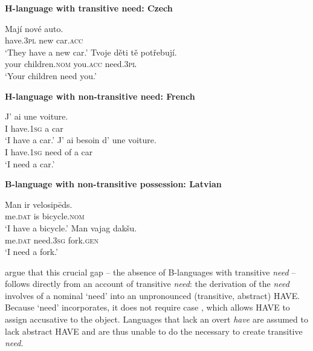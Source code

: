 \documentclass[output=paper,
modfonts
]{langscibook}
\begin{document}
\newpage 
\begin{exe}
\ex \textbf{H-language with transitive need: Czech} \hfill \citep[4a, 5a]{Harves:2012}
\begin{xlist}
\ex \gll Maj\'i nov\'e auto.\\
have.3{\textsc{pl}} new car.\textsc{acc}\\
\glt `They have a new car.'
\ex\gll Tvoje d\v{e}ti t\v{e} pot\v{r}ebuj\'i.\\
your children.{\textsc{nom}} you.{\textsc{acc}} need.3\textsc{pl}\\
\glt `Your children need you.' 
\end{xlist}

\ex \textbf{H-language with non-transitive need: French} \hfill \citep[6a, 7a]{Harves:2012}

\begin{xlist}

\ex \gll J' ai une voiture.\\
I have.1{\textsc{sg}} a car\\
\glt `I have a car.'
\ex\gll J' ai besoin d' une voiture.\\
I have.1{\textsc{sg}} need of a car\\
\glt `I need a car.' \hfill 

\end{xlist}

\ex\textbf{B-language with non-transitive possession: Latvian} \hfill \citep[2b, 3c]{Harves:2012}

\begin{xlist}
\ex\gll Man ir velosip\=eds.\\
me.{\textsc{dat}} is bicycle.\textsc{nom}\\
\glt `I have a bicycle.'
\ex\gll Man vajag dak\v{s}u.\\
me.{\textsc{dat}} need.3{\textsc{sg}} fork.\textsc{gen}\\
\glt `I need a fork.' 

\end{xlist}

\end{exe}

\citet{Harves:2012} argue that this crucial gap -- the absence of B-languages with
transitive {\it need} -- follows directly from an 
account of transitive {\it need}: the derivation of the  {\it
  need} involves  of a nominal `need' into an
unpronounced (transitive, abstract) HAVE. Because `need' incorporates, it does
not require case \citep{Baker:1988c}, which allows HAVE to assign
accusative to the object. Languages that lack an overt {\it have} 
are assumed to lack abstract HAVE and are thus unable to do the necessary
 to create transitive {\it need}.  
\end{document}

